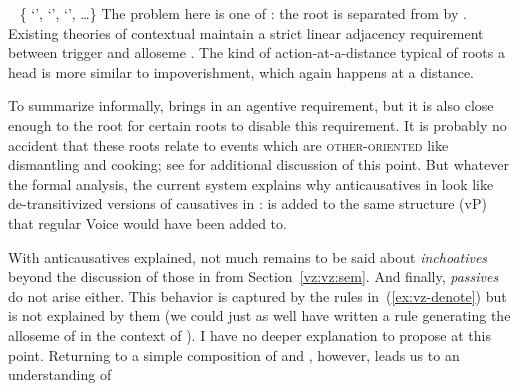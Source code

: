 \begin{exe}
\begin{xlist}
\begin{xlist}
\begin{exe}
\begin{xlist}
\begin{xlist}
\begin{exe}
\begin{xlist}
\begin{xlist}
\begin{exe}
\begin{exe}
\begin{xlist}
\begin{exe}
\begin{exe}
\begin{xlist}
\begin{exe}
\begin{exe}
\begin{exe}
\begin{exe}
\begin{exe}
\begin{xlist}
\begin{exe}
\begin{xlist}
\begin{exe}
\begin{exe}
\begin{xlist}
\begin{exe}
\begin{xlist}
\begin{exe}
\begin{xlist}
\begin{exe}
\begin{exe}
\begin{exe}
\begin{xlist}
\begin{exe}
\begin{exe}
\begin{exe}
\begin{xlist}
\begin{exe}
\begin{xlist}
\begin{exe}
\begin{exe}
\begin{xlist}
\begin{exe}
\begin{exe}
\begin{exe}
\begin{exe}
\begin{xlist}
\begin{exe}
\begin{xlist}
\begin{exe}
\begin{xlist}
\begin{exe}
\begin{xlist}
\begin{exe}
\begin{xlist}
\begin{exe}
\begin{xlist}
\begin{exe}
\begin{exe}
\begin{xlist}
\begin{exe}
\begin{xlist}
\begin{exe}
\begin{exe}
\begin{xlist}
\begin{exe}
\begin{xlist}
\begin{exe}
\begin{exe}
\begin{exe}
\begin{exe}
\begin{xlist}
\begin{xlist}
\begin{exe}
\begin{xlist}
\begin{exe}
\begin{exe}
\begin{exe}
\begin{xlist}
\begin{exe}
\begin{exe}
\begin{xlist}
\begin{exe}
\begin{exe}
\begin{exe}
\begin{xlist}
\begin{xlist}
\begin{exe}
\begin{xlist}
\begin{exe}
\begin{exe}
\begin{exe}
\begin{exe}
\begin{xlist}
\begin{exe}
\begin{xlist}
\begin{exe}
\begin{xlist}
\begin{exe}
\begin{xlist}
\begin{exe}
\begin{exe}
\trace~{\va} \{ `',  `',  `', \dots\}
 \z 
The problem here is one of : the root is separated from {\vz} by {\va}. Existing theories of contextual  maintain a strict linear adjacency requirement between trigger and alloseme \citep{marantz13,kastner16phd}. The kind of action-at-a-distance typical of roots  a head is more similar to impoverishment, which again happens at a distance.

To summarize informally, {\va} brings in an agentive requirement, but it is also close enough to the root for certain roots to disable this requirement. It is probably no accident that these roots relate to events which are \textsc{other-oriented} like dismantling and cooking; see \cite{kastner17gjgl} for additional discussion of this point. But whatever the formal analysis, the current system explains why anticausatives in {\thit} look like de-transitivized versions of causatives in {\tpie}: {\vz} is added to the same structure (vP) that regular Voice would have been added to.

With anticausatives explained, not much remains to be said about \textit{inchoatives} beyond the discussion of those in {\tnif} from Section~\ref{vz:vz:sem}. And finally, \textit{passives} do not arise either. This behavior is captured by the rules in~(\ref{ex:vz-denote}) but is not explained by them (we could just as well have written a rule generating the  alloseme of {\vz} in the context of {\va}). I have no deeper explanation to propose at this point. Returning to a simple composition of {\vz} and {\va}, however, leads us to an understanding of 
\end{exe}
\end{exe}
\end{xlist}
\end{exe}
\end{xlist}
\end{exe}
\end{xlist}
\end{exe}
\end{xlist}
\end{exe}
\end{exe}
\end{exe}
\end{exe}
\end{xlist}
\end{exe}
\end{xlist}
\end{xlist}
\end{exe}
\end{exe}
\end{exe}
\end{xlist}
\end{exe}
\end{exe}
\end{xlist}
\end{exe}
\end{exe}
\end{exe}
\end{xlist}
\end{exe}
\end{xlist}
\end{xlist}
\end{exe}
\end{exe}
\end{exe}
\end{exe}
\end{xlist}
\end{exe}
\end{xlist}
\end{exe}
\end{exe}
\end{xlist}
\end{exe}
\end{xlist}
\end{exe}
\end{exe}
\end{xlist}
\end{exe}
\end{xlist}
\end{exe}
\end{xlist}
\end{exe}
\end{xlist}
\end{exe}
\end{xlist}
\end{exe}
\end{xlist}
\end{exe}
\end{exe}
\end{exe}
\end{exe}
\end{xlist}
\end{exe}
\end{exe}
\end{xlist}
\end{exe}
\end{xlist}
\end{exe}
\end{exe}
\end{exe}
\end{xlist}
\end{exe}
\end{exe}
\end{exe}
\end{xlist}
\end{exe}
\end{xlist}
\end{exe}
\end{xlist}
\end{exe}
\end{exe}
\end{xlist}
\end{exe}
\end{xlist}
\end{exe}
\end{exe}
\end{exe}
\end{exe}
\end{exe}
\end{xlist}
\end{exe}
\end{exe}
\end{xlist}
\end{exe}
\end{exe}
\end{xlist}
\end{xlist}
\end{exe}
\end{xlist}
\end{xlist}
\end{exe}
\end{xlist}
\end{xlist}
\end{exe}
